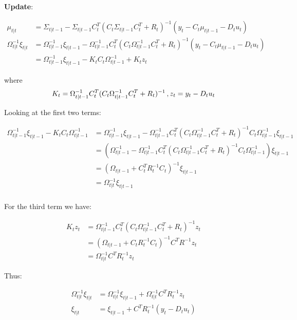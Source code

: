 \documentclass[11pt]{article}
\begin{document}
\textbf{Update}:

\begin{align}
\mu_{t | t} & = \Sigma_{t | t -1} - \Sigma_{t | t -1} C_t^T (C_t \Sigma_{t | t -1} C_t^T + R_t) ^ {-1} (y_t - C_t\mu_{t | t-1} - D_t u_t) \\
\Omega_{t | t}^{-1} \xi_{t | t} & = \Omega_{t | t -1}^{-1} \xi_{t | t-1}  - \Omega_{t | t -1}^{-1}  C_t^T (C_t \Omega_{t | t -1}^{-1} C_t^T + R_t) ^ {-1} (y_t - C_t\mu_{t | t-1} - D_t u_t) \\
& = \Omega_{t | t -1}^{-1} \xi_{t | t -1} - K_t C_t \Omega_{t | t -1}^{-1} + K_t z_t
\end{align}

where \[
K_t = \Omega_{t | t -1}^{-1}  C_t^T (C_t \Omega_{t | t -1}^{-1} C_t^T + R_t) ^ {-1}\, , \\
z_t = y_t - D_t u_t
\]

Looking at the first two terms:

\begin{align}
\Omega_{t | t -1}^{-1} \xi_{t | t -1} - K_t C_t \Omega_{t | t -1}^{-1} &= \Omega_{t | t -1}^{-1} \xi_{t | t-1} -\Omega_{t | t -1}^{-1}  C_t^T (C_t \Omega_{t | t -1}^{-1} C_t^T + R_t) ^ {-1} C_t \Omega_{t | t -1}^{-1} \xi_{t | t-1} \\
&= (\Omega_{t | t -1}^{-1} -\Omega_{t | t -1}^{-1}  C_t^T (C_t \Omega_{t | t -1}^{-1} C_t^T + R_t) ^ {-1} C_t \Omega_{t | t -1}^{-1})\xi_{t | t-1} \\
&= (\Omega_{t | t -1} + C_t^T R_t^{-1} C_t)^{-1} \xi_{t | t-1} \\
&= \Omega_{t | t}^{-1} \xi_{t | t-1} \\
\end{align}

For the third term we have:

\begin{align}
K_t z_t &= \Omega_{t | t -1}^{-1}  C_t^T (C_t \Omega_{t | t -1}^{-1} C_t^T + R_t) ^ {-1} z_t \\
&= (\Omega_{t | t -1} + C_t R_t^{-1} C_t) ^ {-1} C^T R^{-1} z_t \\
&= \Omega_{t | t} ^{-1} C^T R_t ^{-1} z_t
\end{align}

Thus:

\begin{align}
\Omega_{t | t}^{-1} \xi_{t | t} & = \Omega_{t | t}^{-1} \xi_{t | t-1} + \Omega_{t | t} ^{-1} C^T R_t ^{-1} z_t \\
\xi_{t | t} &= \xi_{t | t-1} + C^T R_t ^{-1} (y_t - D_t u_t)
\end{align}
\end{document}
